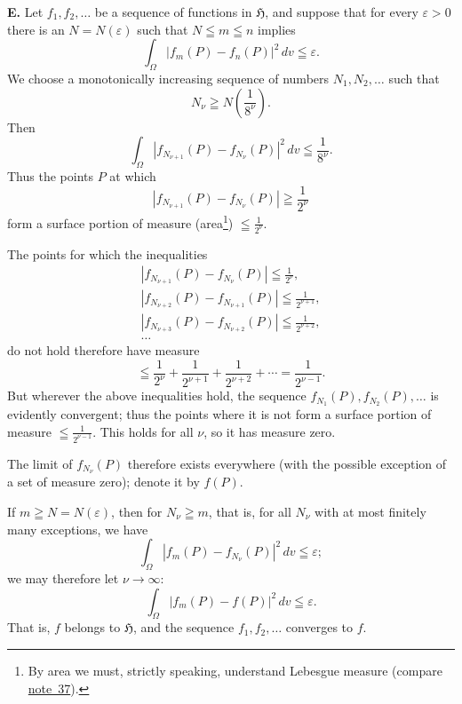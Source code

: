 \documentclass[fontsize=13pt,paper=b5,twoside,bookmarkpackage=false]{scrartcl}
\newcommand{\fnref}[1]{\hyperref[fn:#1]{note~#1}}
\begin{document}
\par\medskip\noindent\textbf{E.} Let $f_1,f_2,\ldots$ be a sequence of functions in $\mathfrak{H}$, and suppose that for every $\varepsilon>0$ there is an $N=N(\varepsilon)$ such that $N\leqq m\leqq n$ implies
\[
 \int_\Omega|f_m(P)-f_n(P)|^2\,dv\leqq\varepsilon.
\]
We choose a monotonically increasing sequence of numbers $N_1,N_2,\ldots$ such that
\[
 N_\nu\geqq N\left(\frac1{8^\nu}\right).
\]
Then
\[
 \int_\Omega|f_{N_{\nu+1}}(P)-f_{N_\nu}(P)|^2\,dv\leqq\frac1{8^\nu}.
\]
Thus the points $P$ at which
\[
 |f_{N_{\nu+1}}(P)-f_{N_\nu}(P)|\geqq\frac1{2^\nu}
\]
form a surface portion of measure (area\footnote[40]{\label{fn:40}By area we must, strictly speaking, understand Lebesgue measure (compare \fnref{37}).}) $\leqq\frac1{2^\nu}$.

The points for which the inequalities
\begin{gather*}
 |f_{N_{\nu+1}}(P)-f_{N_\nu}(P)|\leqq\frac1{2^\nu},\\
 |f_{N_{\nu+2}}(P)-f_{N_{\nu+1}}(P)|\leqq\frac1{2^{\nu+1}},\\
 |f_{N_{\nu+3}}(P)-f_{N_{\nu+2}}(P)|\leqq\frac1{2^{\nu+2}},\\
 \ldots
\end{gather*}
do not hold therefore have measure
\[
 \leqq\frac1{2^\nu}+\frac1{2^{\nu+1}}+\frac1{2^{\nu+2}}+\cdots
 =\frac1{2^{\nu-1}}.
\]
But wherever the above inequalities hold, the sequence $f_{N_1}(P),f_{N_2}(P),\ldots$ is evidently convergent; thus the points where it is not form a surface portion of measure $\leqq\frac1{2^{\nu-1}}$. This holds for all $\nu$, so it has measure zero.

The limit of $f_{N_\nu}(P)$ therefore exists everywhere (with the possible exception of a set of measure zero); denote it by $f(P)$.

If $m\geqq N=N(\varepsilon)$, then for $N_\nu\geqq m$, that is, for all $N_\nu$ with at most finitely many exceptions, we have
\[
 \int_\Omega|f_m(P)-f_{N_\nu}(P)|^2\,dv\leqq\varepsilon;
\]
we may therefore let $\nu\to\infty$:
\[
 \int_\Omega|f_m(P)-f(P)|^2\,dv\leqq\varepsilon.
\]
That is, $f$ belongs to $\mathfrak{H}$, and the sequence $f_1,f_2,\ldots$ converges to $f$.
\end{document}
